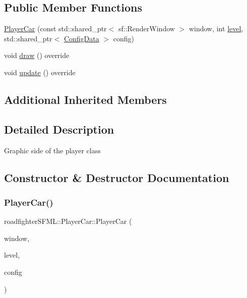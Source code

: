 \subsection*{Public Member Functions}
\begin{DoxyCompactItemize}
\item 
\hyperlink{classroadfighterSFML_1_1PlayerCar_a4fc864a63655f04a3c4144b70214b4b1}{Player\+Car} (const std\+::shared\+\_\+ptr$<$ sf\+::\+Render\+Window $>$ window, int \hyperlink{classroadfighter_1_1PlayerCar_ac198b0404bf9105cf835bf25303e63db}{level}, std\+::shared\+\_\+ptr$<$ \hyperlink{classConfigData}{Config\+Data} $>$ config)
\item 
void \hyperlink{classroadfighterSFML_1_1PlayerCar_a9676cb8164bbc20f2ddedccf73ec5ef8}{draw} () override
\item 
void \hyperlink{classroadfighterSFML_1_1PlayerCar_a1fb9b80b068e689bef90cad28c53869c}{update} () override
\end{DoxyCompactItemize}
\subsection*{Additional Inherited Members}


\subsection{Detailed Description}
Graphic side of the player class 

\subsection{Constructor \& Destructor Documentation}
\mbox{\label{classroadfighterSFML_1_1PlayerCar_a4fc864a63655f04a3c4144b70214b4b1}} 
\subsubsection{\texorpdfstring{Player\+Car()}{PlayerCar()}}
{\footnotesize\ttfamily roadfighter\+S\+F\+M\+L\+::\+Player\+Car\+::\+Player\+Car (\begin{DoxyParamCaption}\item[{const std\+::shared\+\_\+ptr$<$ sf\+::\+Render\+Window $>$}]{window,  }\item[{int}]{level,  }\item[{std\+::shared\+\_\+ptr$<$ \hyperlink{classConfigData}{Config\+Data} $>$}]{config }\end{DoxyParamCaption})}

